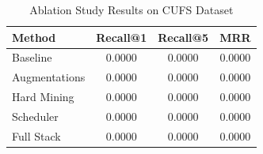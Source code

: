 
\begin{table}[h]
\centering
\caption{Ablation Study Results on CUFS Dataset}
\label{tab:ablation}
\begin{tabular}{lccc}
\toprule
\textbf{Method} & \textbf{Recall@1} & \textbf{Recall@5} & \textbf{MRR} \\
\midrule
Baseline & 0.0000 & 0.0000 & 0.0000 \\
Augmentations & 0.0000 & 0.0000 & 0.0000 \\
Hard Mining & 0.0000 & 0.0000 & 0.0000 \\
Scheduler & 0.0000 & 0.0000 & 0.0000 \\
Full Stack & 0.0000 & 0.0000 & 0.0000 \\
\bottomrule
\end{tabular}
\end{table}
